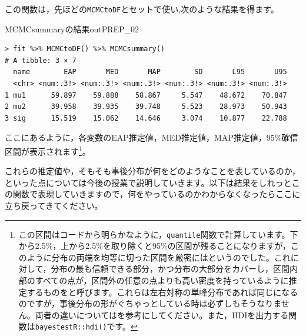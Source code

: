\documentclass{ltjsbook}
\begin{document}
この関数は，先ほどの\verb|MCMCtoDF|とセットで使い,次のような結果を得ます。
\begin{Rscreen}{MCMCsummaryの結果}{outPREP_02}
	\begin{verbatim}
> fit %>% MCMCtoDF() %>% MCMCsummary()
# A tibble: 3 × 7
  name        EAP       MED       MAP        SD       L95       U95
  <chr> <num:.3!> <num:.3!> <num:.3!> <num:.3!> <num:.3!> <num:.3!>
1 mu1      59.897    59.888    58.867     5.547    48.672    70.847
2 mu2      39.958    39.935    39.748     5.523    28.973    50.943
3 sig      15.519    15.062    14.646     3.074    10.877    22.788
  \end{verbatim}
\end{Rscreen}
ここにあるように，各変数のEAP推定値，MED推定値，MAP推定値，95\%確信区間が表示されます\footnote{この区間はコードから明らかなように，\verb|quantile|関数で計算しています。下から2.5\%，上から2.5\%を取り除くと95\%の区間が残ることになりますが，このように分布の両端を均等に切った区間を厳密にはというのでした。これに対して，分布の最も信頼できる部分，かつ分布の大部分をカバーし，区間内部のすべての点が，区間外の任意の点よりも高い密度を持っているように推定するものをと呼びます。これらは左右対称の単峰分布であれば同じになるのですが，事後分布の形がぐちゃっとしている時は必ずしもそうなりません。両者の違いについては\citet{Maeda2017}を参考にしてください。また，HDIを出力する関数は\verb|bayestestR::hdi()|です。}。

これらの推定値や，そもそも事後分布が何をどのようなことを表しているのか，といった点については今後の授業で説明していきます。以下は結果をしれっとこの関数で表現していきますので，何をやっているのかわからなくなったらここに立ち戻ってきてください。
\end{document}
